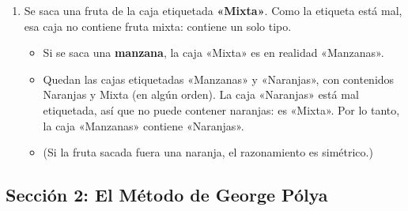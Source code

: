 \documentclass[12pt, letterpaper]{article}
\begin{document}
\begin{enumerate}[leftmargin=*, label=\textbf{\arabic*.}]
    \item Se saca una fruta de la caja etiquetada \textbf{«Mixta»}. Como la etiqueta está mal, esa caja no contiene fruta mixta: contiene un solo tipo.
          \begin{itemize}[leftmargin=*]
            \item Si se saca una \textbf{manzana}, la caja «Mixta» es en realidad «Manzanas».
            \item Quedan las cajas etiquetadas «Manzanas» y «Naranjas», con contenidos Naranjas y Mixta (en algún orden). La caja «Naranjas» está mal etiquetada, así que no puede contener naranjas: es «Mixta». Por lo tanto, la caja «Manzanas» contiene «Naranjas».
            \item (Si la fruta sacada fuera una naranja, el razonamiento es simétrico.)
          \end{itemize}
  \end{enumerate}

  \newpage

  \subsection*{Sección 2: El Método de George Pólya}
\end{document}
